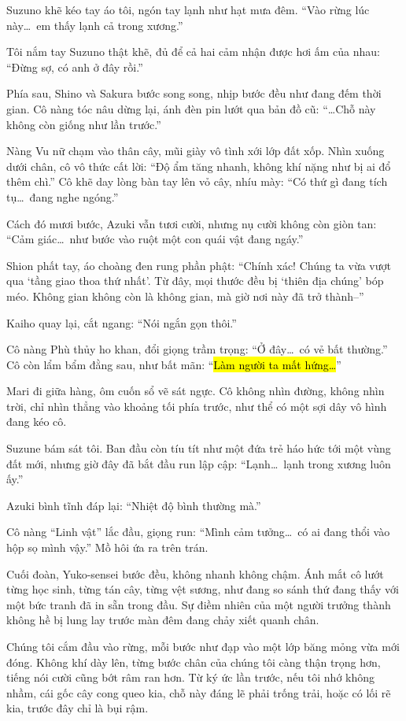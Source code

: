 \documentclass[../main.tex]{subfiles}
\begin{document}
Suzuno khẽ kéo tay áo tôi, ngón tay lạnh như hạt mưa đêm. ``Vào rừng lúc này\dots\ em thấy lạnh cả trong xương.''

Tôi nắm tay Suzuno thật khẽ, đủ để cả hai cảm nhận được hơi ấm của nhau: ``Đừng sợ, có anh ở đây rồi.''

Phía sau, Shino và Sakura bước song song, nhịp bước đều như đang đếm thời gian. Cô nàng tóc nâu dừng lại, ánh đèn pin lướt qua bản đồ cũ: ``\dots Chỗ này không còn giống như lần trước.''

Nàng Vu nữ chạm vào thân cây, mũi giày vô tình xới lớp đất xốp. Nhìn xuống dưới chân, cô vô thức cất lời: ``Độ ẩm tăng nhanh, không khí nặng như bị ai đổ thêm chì.'' Cô khẽ day lòng bàn tay lên vỏ cây, nhíu mày: ``Có thứ gì đang tích tụ\dots\ đang nghe ngóng.''

Cách đó mươi bước, Azuki vẫn tươi cười, nhưng nụ cười không còn giòn tan: ``Cảm giác\dots\ như bước vào ruột một con quái vật đang ngáy.''

Shion phất tay, áo choàng đen rung phần phật: ``Chính xác! Chúng ta vừa vượt qua `tầng giao thoa thứ nhất'. Từ đây, mọi thước đều bị `thiên địa chúng' bóp méo. Không gian không còn là không gian, mà giờ nơi này đã trở thành--''

Kaiho quay lại, cắt ngang: ``Nói ngắn gọn thôi.''

Cô nàng Phù thủy ho khan, đổi giọng trầm trọng: ``Ở đây\dots\ có vẻ bất thường.'' Cô còn lẩm bẩm đằng sau, như bất mãn: ``\hl{Làm người ta mất hứng\dots}''

Mari đi giữa hàng, ôm cuốn sổ vẽ sát ngực. Cô không nhìn đường, không nhìn trời, chỉ nhìn thẳng vào khoảng tối phía trước, như thể có một sợi dây vô hình đang kéo cô.

Suzune bám sát tôi. Ban đầu còn tíu tít như một đứa trẻ háo hức tới một vùng đất mới, nhưng giờ đây đã bắt đầu run lập cập: ``Lạnh\dots\ lạnh trong xương luôn ấy.''

Azuki bình tĩnh đáp lại: ``Nhiệt độ bình thường mà.''

Cô nàng ``Linh vật'' lắc đầu, giọng run: ``Mình cảm tưởng\dots\ có ai đang thổi vào hộp sọ mình vậy.'' Mồ hôi ứa ra trên trán.

Cuối đoàn, Yuko-sensei bước đều, không nhanh không chậm.
Ánh mắt cô lướt từng học sinh, từng tán cây, từng vệt sương, như đang so sánh thứ đang thấy với một bức tranh đã in sẵn trong đầu. Sự điềm nhiên của một người trưởng thành không hề bị lung lay trước màn đêm đang chảy xiết quanh chân.

Chúng tôi cắm đầu vào rừng, mỗi bước như đạp vào một lớp băng mỏng vừa mới đóng. Không khí dày lên, từng bước chân của chúng tôi càng thận trọng hơn, tiếng nói cười cũng bớt râm ran hơn. Từ ký ức lần trước, nếu tôi nhớ không nhầm, cái gốc cây cong queo kia, chỗ này đáng lẽ phải trống trải, hoặc có lối rẽ kia, trước đây chỉ là bụi rậm.
\end{document}
